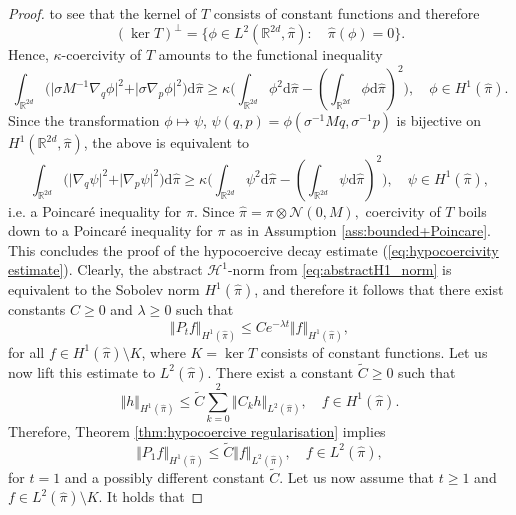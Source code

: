 \begin{proof}
	to see that the kernel of $T$ consists of constant functions and
	therefore 
	\[
	(\ker T)^{\perp}=\{\phi\in L^{2}(\mathbb{R}^{2d},\widehat{\pi}):\quad\widehat{\pi}(\phi)=0\}.
	\]
	Hence, $\kappa$-coercivity of $T$ amounts to the functional inequality
	\[
	\int_{\mathbb{R}^{2d}}\big(\vert\sigma M^{-1}\nabla_{q}\phi\vert^{2}+\vert\sigma\nabla_{p}\phi\vert^{2}\big)\mathrm{d}\widehat{\pi}\ge\kappa\bigg(\int_{\mathbb{R}^{2d}}\phi^{2}\mathrm{d}\widehat{\pi}-\left(\int_{\mathbb{R}^{2d}}\phi\mathrm{d}\widehat{\pi}\right)^{2}\bigg),\quad\phi\in H^{1}(\widehat{\pi}).
	\]
	Since the transformation $\phi\mapsto\psi$, $\psi(q,p)=\phi(\sigma^{-1}Mq,\sigma^{-1}p)$ is bijective on $H^{1}(\mathbb{R}^{2d},\widehat{\pi})$, the above is equivalent to 
	\[
	\int_{\mathbb{R}^{2d}}\big(\vert\nabla_{q}\psi\vert^{2}+\vert\nabla_{p}\psi\vert^{2}\big)\mathrm{d}\widehat{\pi}\ge\kappa\bigg(\int_{\mathbb{R}^{2d}}\psi^{2}\mathrm{d}\widehat{\pi}-\left(\int_{\mathbb{R}^{2d}}\psi\mathrm{d}\widehat{\pi}\right)^{2}\bigg),\quad\psi\in H^{1}(\widehat{\pi}),
	\]
	i.e. a Poincar\'{e} inequality for $\widehat{\pi}$. Since $\widehat{\pi}=\pi\otimes\mathcal{N}(0,M),$
	coercivity of $T$ boils down to a Poincar\'{e} inequality for $\pi$
	as in Assumption \ref{ass:bounded+Poincare}. This concludes the proof of the hypocoercive decay estimate
	(\ref{eq:hypocoercivity estimate}). Clearly, the abstract $\mathcal{H}^{1}$-norm from \eqref{eq:abstractH1_norm}
	is equivalent to the Sobolev norm $H^{1}(\widehat{\pi})$, and therefore it follows that there exist constants $C\ge0$ and $\lambda\ge0$ such that 
	\begin{equation}
	\label{eq:H1_decay}
	\Vert P_{t} f \Vert_{H^1(\widehat{\pi})}  \le C e^{-\lambda t} \Vert f \Vert _{H^1(\widehat{\pi})},
	\end{equation}
	for all $f \in H^1(\widehat{\pi})\setminus K$, where $K=\ker T$ consists of constant functions.  Let us now lift this estimate to $L^2(\widehat{\pi})$. There exist a constant $\tilde{C}\ge0$ such that 
	\begin{equation}
	\Vert h \Vert_{H^1(\widehat{\pi})} \le \tilde{C} \sum_{k=0}^2 \Vert C_k h \Vert_{L^2(\widehat{\pi})},
	\quad f \in H^1(\widehat{\pi}).
	\end{equation}
	Therefore, Theorem \ref{thm:hypocoercive regularisation} implies 
	\begin{equation}
	\label{eq:H1L2_reg}
	\Vert P_{1} f \Vert_{H^1(\widehat{\pi})} \le \tilde{C} \Vert f \Vert_{L^2(\widehat{\pi})},
	\quad f \in L^2(\widehat{\pi}), 
	\end{equation}
	for $t=1$ and a possibly different constant $\tilde{C}$. Let us now assume that $t\ge1$ and $f \in L^2(\widehat{\pi})\setminus K$.	It holds that

\end{proof}
